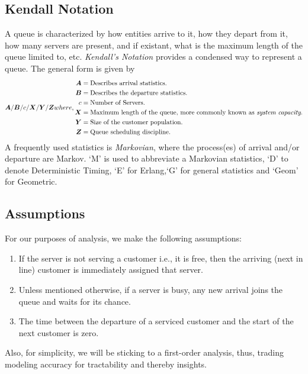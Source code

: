 \documentclass[11pt, a4paper]{report}
\begin{document}
\subsection{Kendall Notation}
A queue is characterized by how entities arrive to it, how they depart from it, how many servers are present, and if existant, what is the maximum length of the queue limited to, etc. \emph{Kendall's Notation} provides a condensed way to represent a queue. The general form is given by 
\begin{subequations}
    \begin{align}
        \mA/ \mB/ c/ \mX/ \mY/ \mZ 
    \end{align}
    where, 
    \begin{align*}
        \mA &= \text{Describes arrival statistics.}\\
        \mB &= \text{Describes the departure statistics.} \\
        c &= \text{Number of Servers.}\\
        \mX &= \text{Maximum length of the queue, more commonly known as \emph{system capacity}.}\\
        \mY &= \text{Size of the customer population}. \\
        \mZ &= \text{Queue scheduling discipline.}
    \end{align*}
\end{subequations}
A frequently used statistics is \emph{Markovian}, where the process(es) of arrival and/or departure are Markov. `M' is used to abbreviate a Markovian statistics, `D' to denote Deterministic Timing, `E' for Erlang,`G' for general statistics and `Geom' for Geometric. 

\subsection{Assumptions}

For our purposes of analysis, we make the following assumptions:
\begin{enumerate}
    \item If the server is not serving a customer i.e., it is free, then the arriving (next in line) customer is immediately assigned that server.
    \item Unless mentioned otherwise, if a server is busy, any new arrival joins the queue and waits for its chance.
    \item The time between the departure of a serviced customer and the start of the next customer is zero.
\end{enumerate}
Also, for simplicity, we will be sticking to a first-order analysis, thus, trading modeling accuracy for tractability and thereby insights.
\end{document}
